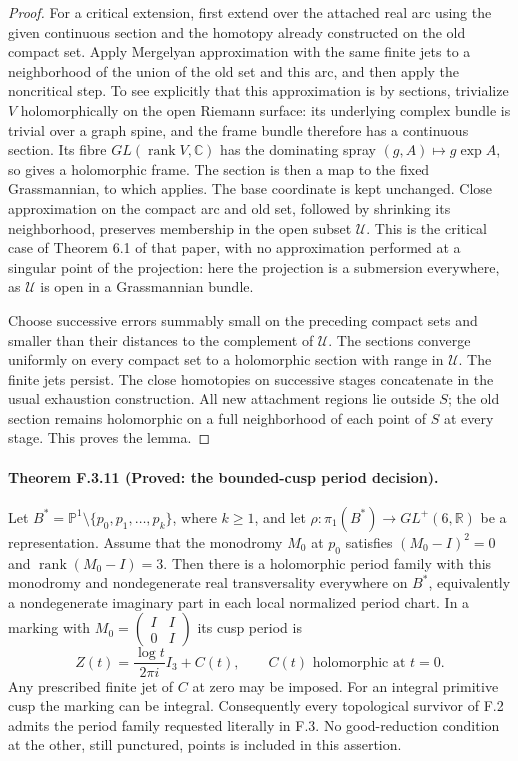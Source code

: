 \begin{proof}
For a critical extension, first extend over the attached real
arc using the given continuous section and the homotopy already
constructed on the old compact set.  Apply Mergelyan
approximation with the same finite jets to a neighborhood of
the union of the old set and this arc, and then apply the
noncritical step.  To see explicitly that this approximation
is by sections, trivialize $V$ holomorphically on the open
Riemann surface: its underlying complex bundle is trivial over
a graph spine, and the frame bundle therefore has a continuous
section.  Its fibre $GL(\operatorname{rank}V,\mathbb C)$ has
the dominating spray $(g,A)\mapsto g\exp A$, so
\cite[Theorem 1.2]{ffForstnericPrezelj02} gives a holomorphic
frame.  The section is then a map to the
fixed Grassmannian, to which
\cite[Theorem 2.13]{ffAlarconForstneric25} applies.  The base
coordinate is kept unchanged.  Close approximation on the
compact arc and old set, followed by shrinking its
neighborhood, preserves membership in the open subset
$\mathscr U$.  This is the critical case of Theorem 6.1 of
that paper, with no approximation performed at a singular
point of the projection: here the projection is a submersion
everywhere, as $\mathscr U$ is open in a Grassmannian bundle.

Choose successive errors summably small on the preceding
compact sets and smaller than their distances to the complement
of $\mathscr U$.  The sections converge uniformly on every
compact set to a holomorphic section with range in
$\mathscr U$.  The finite jets persist.  The close homotopies
on successive stages concatenate in the usual exhaustion
construction.  All new attachment regions lie outside $S$;
the old section remains holomorphic on a full neighborhood of
each point of $S$ at every stage.  This proves the lemma.
\end{proof}

\paragraph{Theorem F.3.11 (Proved: the bounded-cusp period decision).}
Let
$B^*=\mathbb P^1\setminus\{p_0,p_1,\ldots,p_k\}$,
where $k\ge1$, and let
$\rho:\pi_1(B^*)\to GL^+(6,\mathbb R)$ be a representation.
Assume that the monodromy $M_0$ at $p_0$ satisfies
$(M_0-I)^2=0$ and $\operatorname{rank}(M_0-I)=3$.
Then there is a holomorphic period family with this monodromy
and nondegenerate real transversality everywhere on $B^*$,
equivalently a nondegenerate imaginary part in each local
normalized period chart.
In a marking with $M_0=\left(\begin{smallmatrix}I&I\\0&I\end{smallmatrix}\right)$
its cusp period is
\[
 Z(t)=\frac{\log t}{2\pi i}I_3+C(t),
 \qquad C(t)\text{ holomorphic at }t=0.
 \tag{F.O6}
\]
Any prescribed finite jet of $C$ at zero may be imposed.
For an integral primitive cusp the marking can be integral.
Consequently every topological survivor of F.2 admits the
period family requested literally in F.3.  No good-reduction
condition at the other, still punctured, points is included
in this assertion.

